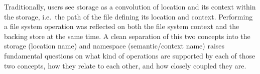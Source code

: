 Traditionally, users see storage as a convolution of location and its context within the storage, i.e.~the path of the file defining its location and context. 
Performing a file system operation was reflected on both the file system context and the backing store at the same time. 
A clean separation of this two concepts into the storage (location name) and namespace (semantic/context name) raises fundamental questions on what kind of operations are supported by each of those two concepts, how  they relate to each other, and how closely coupled they are. 




